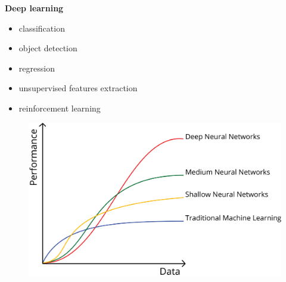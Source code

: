\documentclass[xcolor=dvipsnames]{beamer}
\begin{document}
\begin{frame}{\bf Deep learning}

\begin{itemize}
  \item classification
  \item object detection
  \item regression
  \item unsupervised features extraction
  \item reinforcement learning
\end{itemize}


\begin{figure}
\includegraphics[scale=0.1]{../../pictures/dl_vs_ml.png}
\end{figure}

\end{frame}
\end{document}
